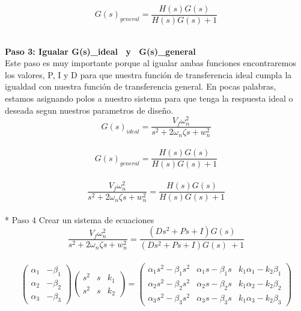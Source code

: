 \documentclass[12pt,letterpaper]{article}
\begin{document}
\begin{equation}G(s)_{general} =  \frac{H(s)G(s)}{H(s)G(s) +1}\end{equation} \\ 


\setcounter{equation}{0} %

\textbf{Paso 3: Igualar  {G(s)_{ideal} \ y \ G(s)_{general}} } \\  

Este paso es muy importante porque al igualar ambas funciones encontraremos los valores, P, I y D para que nuestra función de transferencia ideal cumpla la igualdad con nuestra función de transferencia general. En pocas palabras, estamos asignando polos a nuestro sistema para que tenga la respuesta ideal o deseada segun nuestros parametros de diseño. \\ 

\begin{equation}G(s)_{ideal}=\frac{V_{f} \omega_{n}^{2}}{s^{2}+2 \omega_{n}\zeta s+w_{n}^{2}}\end{equation} \\ 
 
\begin{equation} G(s)_{general} =  \frac{H(s)G(s)}{H(s)G(s) +1}\end{equation} \\ 

\begin{equation}
    \frac{V_{f} \omega_{n}^{2}}{s^{2}+2 \omega_{n}\zeta s+w_{n}^{2}} =  \frac{H(s)G(s)}{H(s)G(s) +1} 
\end{equation} \\

* Paso 4 Crear un sistema de ecuaciones \\ 
\begin{equation}
    \frac{V_{f} \omega_{n}^{2}}{s^{2}+2 \omega_{n}\zeta s+w_{n}^{2}} =  \frac{(Ds^{2} + Ps + I)G(s)}{(Ds^{2} + Ps + I)G(s) \ + 1}
\end{equation} \\


\begin{equation}\left(\begin{array}{cc}
\alpha_{1} & -\beta_{1} \\
\alpha_{2} & -\beta_{2} \\
\alpha_{3} & -\beta_{3}
\end{array}\right)\left(\begin{array}{ccc}
s^{2} & s & k_{1} \\
s^{2} & s & k_{2}
\end{array}\right)=\left(\begin{array}{ccc}
\alpha_{1} s^{2}-\beta_{1} s^{2} & \alpha_{1} s-\beta_{1} s & k_{1} \alpha_{1}-k_{2} \beta_{1} \\
\alpha_{2} s^{2}-\beta_{2} s^{2} & \alpha_{2} s-\beta_{2} s & k_{1} \alpha_{2}-k_{2} \beta_{2} \\
\alpha_{3} s^{2}-\beta_{3} s^{2} & \alpha_{3} s-\beta_{3} s & k_{1} \alpha_{3}-k_{2} \beta_{3}
\end{array}\right)\end{equation} \\ \\ 
\end{document}
